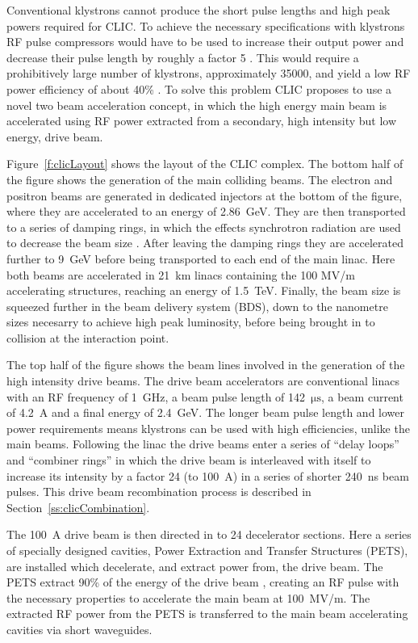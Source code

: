 Conventional klystrons cannot produce the short pulse lengths and high peak powers required for CLIC. To achieve the necessary specifications with klystrons RF pulse compressors would have to be used to increase their output power and decrease their pulse length by roughly a factor 5 \cite{clicCDR}. This would require a prohibitively large number of klystrons, approximately 35000, and yield a low RF power efficiency of about 40\% \cite{clicCDR}. To solve this problem CLIC proposes to use a novel two beam acceleration concept, in which the high energy main beam is accelerated using RF power extracted from a secondary, high intensity but low energy, drive beam.

Figure~\ref{f:clicLayout} shows the layout of the CLIC complex. The bottom half of the figure shows the generation of the main colliding beams. The electron and positron beams are generated in dedicated injectors at the bottom of the figure, where they are accelerated to an energy of 2.86~GeV. They are then transported to a series of damping rings, in which the effects synchrotron radiation are used to decrease the beam size \cite{dampRings}. After leaving the damping rings they are accelerated further to 9~GeV before being transported to each end of the main linac. Here both beams are accelerated in 21~km linacs containing the 100 MV/m accelerating structures, reaching an energy of 1.5~TeV. Finally, the beam size is squeezed further in the beam delivery system (BDS), down to the nanometre sizes necesarry to achieve high peak luminosity, before being brought in to collision at the interaction point.

The top half of the figure shows the beam lines involved in the generation of the high intensity drive beams. The drive beam accelerators are conventional linacs with an RF frequency of 1~GHz, a beam pulse length of 142~\(\mathrm{\mu s}\), a beam current of 4.2~A and a final energy of 2.4~GeV. The longer beam pulse length and lower power requirements means klystrons can be used with high efficiencies, unlike the main beams. Following the linac the drive beams enter a series of ``delay loops'' and ``combiner rings'' in which the drive beam is interleaved with itself to increase its intensity by a factor 24 (to 100~A) in a series of shorter 240~ns beam pulses. This drive beam recombination process is described in Section~\ref{ss:clicCombination}.

The 100~A drive beam is then directed in to 24 decelerator sections. Here a series of specially designed cavities, Power Extraction and Transfer Structures (PETS), are installed which decelerate, and extract power from, the drive beam. The PETS extract 90\% of the energy of the drive beam \cite{clicCDR}, creating an RF pulse with the necessary properties to accelerate the main beam at 100~MV/m. The extracted RF power from the PETS is transferred to the main beam accelerating cavities via short waveguides.




